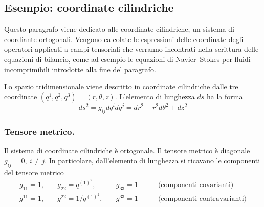 \subsection{Esempio: coordinate cilindriche}\label{ch:coordCyl}
Questo paragrafo viene dedicato alle coordinate cilindriche, un sistema di coordiante ortogonali. Vengono calcolate le espressioni delle coordinate degli operatori applicati a campi tensoriali che verranno incontrati nella scrittura delle equazioni di bilancio, come ad esempio le equazioni di Navier--Stokes per fluidi incomprimibili introdotte alla fine del paragrafo.

Lo spazio tridimensionale viene descritto in coordinate cilindriche dalle tre coordinate
 $(q^1,q^2,q^3) = (r,\theta,z)$. L'elemento di lunghezza $ds$ ha la forma
\begin{equation}
 ds^2 = g_{ij} dq^i dq^j = dr^2 + r^2 d\theta^2 + dz^2
\end{equation}

\subsubsection{Tensore metrico.}
Il sistema di coordinate cilindriche è ortogonale. Il tensore metrico è diagonale $g_{ij} = 0, \ i\ne j$.
In particolare, dall'elemento di lunghezza si ricavano le componenti del tensore metrico
\begin{equation}
\begin{aligned}
  g_{11} = 1 ,& \quad g_{22} = q^{(1)^2}     ,& \quad g_{33} = 1 & \qquad \text{(componenti covarianti)} \\
  g^{11} = 1 ,& \quad g^{22} = 1 / q^{(1)^2} ,& \quad g^{33} = 1 & \qquad \text{(componenti contravarianti)}
\end{aligned}
\end{equation}

